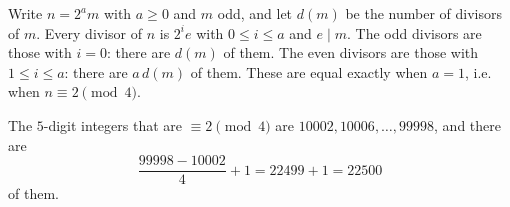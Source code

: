 Write $n=2^a m$ with $a\ge0$ and $m$ odd, and let $d(m)$ be the number of divisors of $m$. Every divisor of $n$ is $2^i e$ with $0\le i\le a$ and $e\mid m$. The odd divisors are those with $i=0$: there are $d(m)$ of them. The even divisors are those with $1\le i\le a$: there are $a\,d(m)$ of them. These are equal exactly when $a=1$, i.e. when $n\equiv2\pmod4$.

The $5$-digit integers that are $\equiv2\pmod4$ are $10002,10006,\dots,99998$, and there are
\[\dfrac{99998-10002}{4}+1=22499+1=\boxed{22500}\]
of them.
